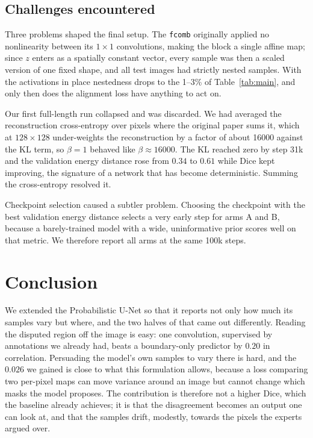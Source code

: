 \documentclass[10pt]{article}
\begin{document}
\subsection{Challenges encountered}

Three problems shaped the final setup. The \texttt{fcomb} originally applied no
nonlinearity between its $1\times1$ convolutions, making the block a single
affine map; since $z$ enters as a spatially constant vector, every sample was
then a scaled version of one fixed shape, and all test images had strictly nested
samples. With the activations in place nestedness drops to the 1--3\% of
Table~\ref{tab:main}, and only then does the alignment loss have anything to act
on.

Our first full-length run collapsed and was discarded. We had averaged the
reconstruction cross-entropy over pixels where the original paper sums it, which
at $128\times128$ under-weights the reconstruction by a factor of about 16000
against the KL term, so $\beta=1$ behaved like $\beta\approx16000$. The KL reached
zero by step 31k and the validation energy distance rose from $0.34$ to $0.61$
while Dice kept improving, the signature of a network that has become
deterministic. Summing the cross-entropy resolved it.

Checkpoint selection caused a subtler problem. Choosing the checkpoint with the
best validation energy distance selects a very early step for arms A and B,
because a barely-trained model with a wide, uninformative prior scores well on
that metric. We therefore report all arms at the same 100k steps.

\section{Conclusion}\label{sec:conc}

We extended the Probabilistic U-Net so that it reports not only how much its
samples vary but where, and the two halves of that came out differently. Reading
the disputed region off the image is easy: one convolution, supervised by
annotations we already had, beats a boundary-only predictor by $0.20$ in
correlation. Persuading the model's own samples to vary there is hard, and the
$0.026$ we gained is close to what this formulation allows, because a loss
comparing two per-pixel maps can move variance around an image but cannot change
which masks the model proposes. The contribution is therefore not a higher Dice,
which the baseline already achieves; it is that the disagreement becomes an
output one can look at, and that the samples drift, modestly, towards the pixels
the experts argued over.
\end{document}
